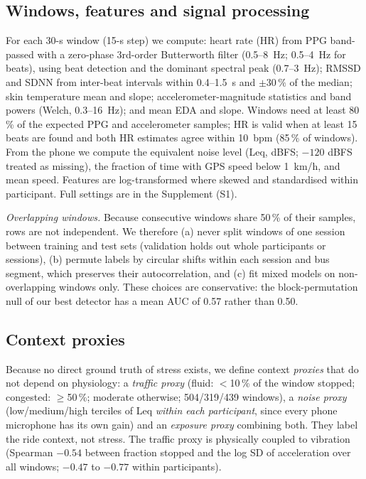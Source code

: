 \documentclass[runningheads]{llncs}
\begin{document}
\subsection{Windows, features and signal processing}
For each 30-s window (15-s step) we compute: heart rate (HR) from PPG band-passed with a zero-phase 3rd-order Butterworth filter (0.5--8~Hz; 0.5--4~Hz for beats), using beat detection and the dominant spectral peak (0.7--3~Hz); RMSSD and SDNN from inter-beat intervals within 0.4--1.5~s and $\pm30\,\%$ of the median; skin temperature mean and slope; accelerometer-magnitude statistics and band powers (Welch, 0.3--16~Hz); and mean EDA and slope. Windows need at least 80\,\% of the expected PPG and accelerometer samples; HR is valid when at least 15 beats are found and both HR estimates agree within 10~bpm (85\,\% of windows). From the phone we compute the equivalent noise level (Leq, dBFS; $-120$ dBFS treated as missing), the fraction of time with GPS speed below 1~km/h, and mean speed. Features are log-transformed where skewed and standardised within participant. Full settings are in the Supplement (S1).

\emph{Overlapping windows.} Because consecutive windows share 50\,\% of their samples, rows are not independent. We therefore (a) never split windows of one session between training and test sets (validation holds out whole participants or sessions), (b) permute labels by circular shifts within each session and bus segment, which preserves their autocorrelation, and (c) fit mixed models on non-overlapping windows only. These choices are conservative: the block-permutation null of our best detector has a mean AUC of 0.57 rather than 0.50.

\subsection{Context proxies}
Because no direct ground truth of stress exists, we define context \emph{proxies} that do not depend on physiology: a \emph{traffic proxy} (fluid: $<$10\,\% of the window stopped; congested: $\geq$50\,\%; moderate otherwise; 504/319/439 windows), a \emph{noise proxy} (low/medium/high terciles of Leq \emph{within each participant}, since every phone microphone has its own gain) and an \emph{exposure proxy} combining both. They label the ride context, not stress. The traffic proxy is physically coupled to vibration (Spearman $-0.54$ between fraction stopped and the log SD of acceleration over all windows; $-0.47$ to $-0.77$ within participants).
\end{document}

